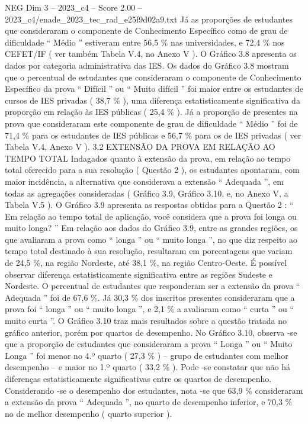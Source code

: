 \begin{textsample}{NEG Dim 3 – 2023\_c4 – Score 2.00 – 2023\_c4/enade\_2023\_tec\_rad\_e25f9d02a9.txt}
Já as proporções de estudantes que consideraram o componente de Conhecimento Específico como de grau de dificuldade “ Médio ” estiveram entre 56,5 \% nas universidades, e 72,4 \% nos CEFET/IF ( ver também Tabela V.4, no Anexo V ).
O Gráfico 3.8 apresenta os dados por categoria administrativa das IES.
Os dados do Gráfico 3.8 mostram que o percentual de estudantes que consideraram o componente de Conhecimento Específico da prova “ Difícil ” ou “ Muito difícil ” foi maior entre os estudantes de cursos de IES privadas ( 38,7 \% ), uma diferença estatisticamente significativa da proporção em relação às IES públicas ( 25,4 \% ).
Já a proporção de presentes na prova que consideraram este componente de grau de dificuldade “ Médio ” foi de 71,4 \% para os estudantes de IES públicas e 56,7 \% para os de IES privadas ( ver Tabela V.4, Anexo V ). 3.2 EXTENSÃO DA PROVA EM RELAÇÃO AO TEMPO TOTAL Indagados quanto à extensão da prova, em relação ao tempo total oferecido para a sua resolução ( Questão 2 ), os estudantes apontaram, com maior incidência, a alternativa que considerava a extensão “ Adequada ”, em todas as agregações consideradas ( Gráfico 3.9, Gráfico 3.10, e, no Anexo V, a Tabela V.5 ).
O Gráfico 3.9 apresenta as respostas obtidas para a Questão 2 : “ Em relação ao tempo total de aplicação, você considera que a prova foi longa ou muito longa? ” Em relação aos dados do Gráfico 3.9, entre as grandes regiões, os que avaliaram a prova como “ longa ” ou “ muito longa ”, no que diz respeito ao tempo total destinado à sua resolução, resultaram em porcentagens que variam de 24,5 \%, na região Nordeste, até 38,1 \%, na região Centro-Oeste.
É possível observar diferença estatisticamente significativa entre as regiões Sudeste e Nordeste.
O percentual de estudantes que responderam ser a extensão da prova “ Adequada ” foi de 67,6 \%.
Já 30,3 \% dos inscritos presentes consideraram que a prova foi “ longa ” ou “ muito longa ”, e 2,1 \% a avaliaram como “ curta ” ou “ muito curta ”.
O Gráfico 3.10 traz mais resultados sobre a questão tratada no gráfico anterior, porém por quartos de desempenho.
No Gráfico 3.10, observa -se que a proporção de estudantes que consideraram a prova “ Longa ” ou “ Muito Longa ” foi menor no 4.º quarto ( 27,3 \% ) – grupo de estudantes com melhor desempenho – e maior no 1.º quarto ( 33,2 \% ).
Pode -se constatar que não há diferenças estatisticamente significativas entre os quartos de desempenho.
Considerando -se o desempenho dos estudantes, nota -se que 63,9 \% consideraram a extensão da prova “ Adequada ”, no quarto de desempenho inferior, e 70,3 \% no de melhor desempenho ( quarto superior ).

\end{textsample}
